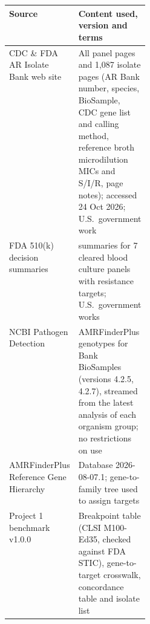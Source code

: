 \begin{tabularx}{\linewidth}{@{}>{\raggedright\arraybackslash}p{0.27\linewidth}>{\raggedright\arraybackslash}X@{}}
\toprule
Source & Content used, version and terms \\
\midrule
CDC \& FDA AR Isolate Bank web site & All panel pages and 1,087 isolate pages (AR Bank number, species, BioSample, CDC gene list and calling method, reference broth microdilution MICs and S/I/R, page notes); accessed 24 Oct 2026; U.S.\ government work \\
FDA 510(k) decision summaries & 9 summaries for 7 cleared blood culture panels with resistance targets; U.S.\ government works \\
NCBI Pathogen Detection & AMRFinderPlus genotypes for Bank BioSamples (versions 4.2.5, 4.2.7), streamed from the latest analysis of each organism group; no restrictions on use \\
AMRFinderPlus Reference Gene Hierarchy & Database 2026-08-07.1; gene-to-family tree used to assign targets \\
Project 1 benchmark v1.0.0 & Breakpoint table (CLSI M100-Ed35, checked against FDA STIC), gene-to-target crosswalk, concordance table and isolate list \\
\bottomrule
\end{tabularx}
